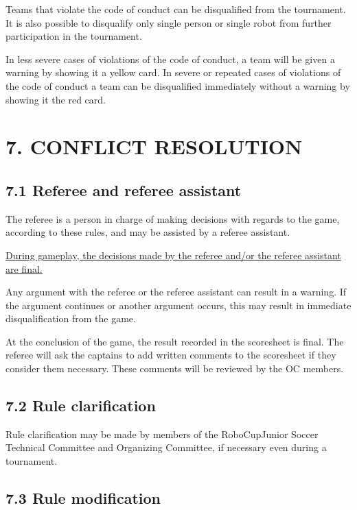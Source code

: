 \documentclass{article}
\begin{document}
Teams that violate the code of conduct can be disqualified from the tournament. It is also possible to disqualify only single person or single robot from further participation in the tournament. 

In less severe cases of violations of the code of conduct, a team will be given a warning by showing it a yellow card. In severe or repeated cases of violations of the code of conduct a team can be disqualified immediately without a warning by showing it the red card. 

\section{7. CONFLICT RESOLUTION \label{ref-047}}

\subsection{7.1 Referee and referee assistant \label{ref-048}}

\textcolor{color-5}{The referee is a person in charge of making decisions with regards to the game, according to these rules, and may be assisted by a referee assistant.}

 \underline{During gameplay, the decisions made by the referee and/or the referee assistant are final.} 

Any argument with the referee or the referee assistant can result in a warning. If the argument continues or another argument occurs, this may result in immediate disqualification from the game.

At the conclusion of the game, the \textcolor{color-5}{result recorded in the scoresheet is final. The referee will ask the captains to add written comments to the scoresheet if they consider them necessary. These comments will be reviewed by the OC members.} 

\subsection{7.2 Rule clarification \label{ref-049}}

Rule clarification may be made by members of the RoboCupJunior Soccer Technical Committee and Organizing Committee, if necessary even during a tournament. 

\subsection{7.3 Rule modification \label{ref-050}}
\end{document}
